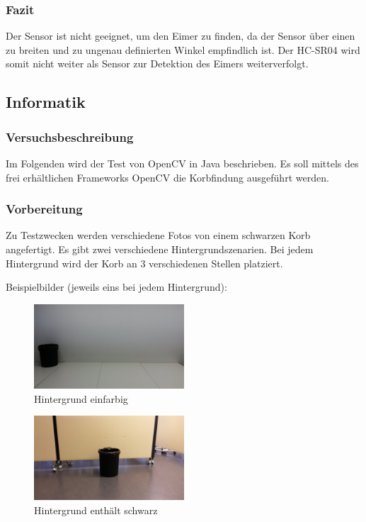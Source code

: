 \subsubsection{Fazit}
Der Sensor ist nicht geeignet, um den Eimer zu finden, da der Sensor über 
einen zu breiten und zu ungenau definierten Winkel empfindlich ist. Der 
HC-SR04 wird somit nicht weiter als Sensor zur Detektion des Eimers 
weiterverfolgt. 

\subsection{Informatik}

\subsubsection{Versuchsbeschreibung}
Im Folgenden wird der Test von OpenCV in Java beschrieben. Es soll mittels des frei erhältlichen Frameworks OpenCV die Korbfindung ausgeführt werden.

\subsubsection{Vorbereitung}
Zu Testzwecken werden verschiedene Fotos von einem schwarzen Korb angefertigt. Es gibt zwei verschiedene Hintergrundszenarien. Bei jedem Hintergrund wird der Korb an 3 verschiedenen Stellen platziert.

Beispielbilder (jeweils eins bei jedem Hintergrund):

\begin{figure}[h!]
	\centering
	\includegraphics[width=0.5\textwidth]{fig/korb4.jpg}
	\caption{Hintergrund einfarbig}
	\label{fig:Korb_HEinfarbig}
\end{figure}

\begin{figure}[h!]
	\centering
	\includegraphics[width=0.5\textwidth]{fig/korb1.jpg}
	\caption{Hintergrund enthält schwarz}
	\label{fig:Korb_HSchwarz}
\end{figure}

